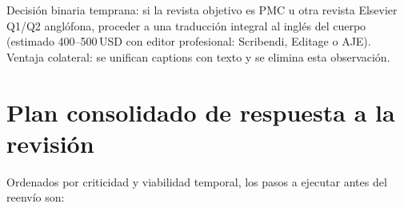 \documentclass[11pt,a4paper]{article}
\begin{document}
\begin{abordaje}
Decisi\'on binaria temprana: si la revista objetivo es PMC u otra revista Elsevier Q1/Q2 angl\'ofona, proceder a una traducci\'on integral al ingl\'es del cuerpo (estimado 400--500\,USD con editor profesional: Scribendi, Editage o AJE). Ventaja colateral: se unifican captions con texto y se elimina esta observaci\'on.
\end{abordaje}

\section{Plan consolidado de respuesta a la revisi\'on}

Ordenados por criticidad y viabilidad temporal, los pasos a ejecutar antes del reenv\'io son:
\end{document}
